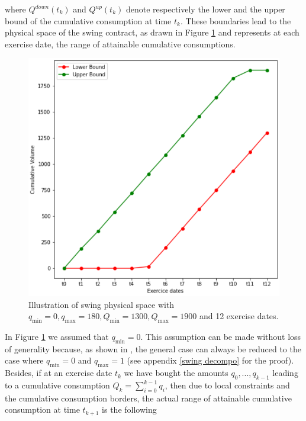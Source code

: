 \documentclass{article}
\numberwithin{equation}{section}
\begin{document}
\vspace{0.2cm}

\noindent
where $Q^{down}(t_k)$ and $Q^{up}(t_k)$ denote respectively the lower and the upper bound of the cumulative consumption at time $t_k$. These boundaries lead to the physical space of the swing contract, as drawn in Figure \ref{physical space swing} and represents at each exercise date, the range of attainable cumulative consumptions.


\begin{figure}[!ht]
    \center
    \includegraphics[scale=0.3]{Images/swing_grid_eg.PNG}
    \caption{Illustration of swing physical space with $q_{\min} = 0, q_{\max} = 180, Q_{\min} = 1300, Q_{\max} = 1900$ and 12 exercise dates.}
    \label{physical space swing}
\end{figure}

\noindent
In Figure \ref{physical space swing} we assumed that $q_{\min} = 0$. This assumption can be made without loss of generality because, as shown in \cite{Bardou2009OptimalQF}, the general case can always be reduced to the case where $q_{\min} = 0$ and $q_{\max} = 1$ (see appendix \ref{swing decompo} for the proof). Besides, if at an exercise date $t_k$ we have bought the amounts $q_{0},...,q_{k-1}$ leading to a cumulative consumption $\displaystyle Q_k = \sum_{i = 0}^{k -1} q_i$, then due to local constraints and the cumulative consumption borders, the actual range of attainable cumulative consumption at time $t_{k+1}$ is the following
\end{document}
